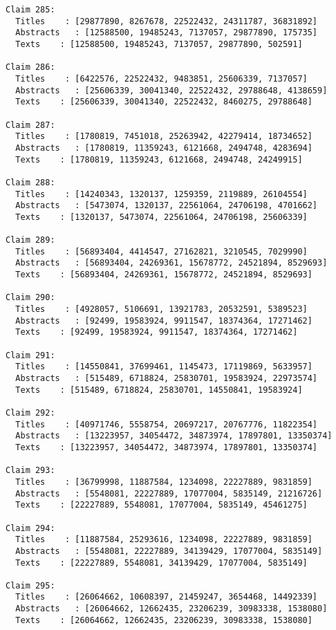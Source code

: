 \documentclass[11pt]{article}
\begin{document}
\begin{Verbatim}[commandchars=\\\{\}]
Claim 285:
  Titles    : [29877890, 8267678, 22522432, 24311787, 36831892]
  Abstracts   : [12588500, 19485243, 7137057, 29877890, 175735]
  Texts    : [12588500, 19485243, 7137057, 29877890, 502591]

Claim 286:
  Titles    : [6422576, 22522432, 9483851, 25606339, 7137057]
  Abstracts   : [25606339, 30041340, 22522432, 29788648, 4138659]
  Texts    : [25606339, 30041340, 22522432, 8460275, 29788648]

Claim 287:
  Titles    : [1780819, 7451018, 25263942, 42279414, 18734652]
  Abstracts   : [1780819, 11359243, 6121668, 2494748, 4283694]
  Texts    : [1780819, 11359243, 6121668, 2494748, 24249915]

Claim 288:
  Titles    : [14240343, 1320137, 1259359, 2119889, 26104554]
  Abstracts   : [5473074, 1320137, 22561064, 24706198, 4701662]
  Texts    : [1320137, 5473074, 22561064, 24706198, 25606339]

Claim 289:
  Titles    : [56893404, 4414547, 27162821, 3210545, 7029990]
  Abstracts   : [56893404, 24269361, 15678772, 24521894, 8529693]
  Texts    : [56893404, 24269361, 15678772, 24521894, 8529693]

Claim 290:
  Titles    : [4928057, 5106691, 13921783, 20532591, 5389523]
  Abstracts   : [92499, 19583924, 9911547, 18374364, 17271462]
  Texts    : [92499, 19583924, 9911547, 18374364, 17271462]

Claim 291:
  Titles    : [14550841, 37699461, 1145473, 17119869, 5633957]
  Abstracts   : [515489, 6718824, 25830701, 19583924, 22973574]
  Texts    : [515489, 6718824, 25830701, 14550841, 19583924]

Claim 292:
  Titles    : [40971746, 5558754, 20697217, 20767776, 11822354]
  Abstracts   : [13223957, 34054472, 34873974, 17897801, 13350374]
  Texts    : [13223957, 34054472, 34873974, 17897801, 13350374]

Claim 293:
  Titles    : [36799998, 11887584, 1234098, 22227889, 9831859]
  Abstracts   : [5548081, 22227889, 17077004, 5835149, 21216726]
  Texts    : [22227889, 5548081, 17077004, 5835149, 45461275]

Claim 294:
  Titles    : [11887584, 25293616, 1234098, 22227889, 9831859]
  Abstracts   : [5548081, 22227889, 34139429, 17077004, 5835149]
  Texts    : [22227889, 5548081, 34139429, 17077004, 5835149]

Claim 295:
  Titles    : [26064662, 10608397, 21459247, 3654468, 14492339]
  Abstracts   : [26064662, 12662435, 23206239, 30983338, 1538080]
  Texts    : [26064662, 12662435, 23206239, 30983338, 1538080]


\end{Verbatim}
\end{document}
